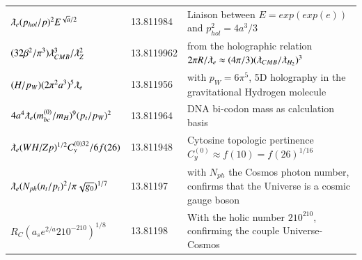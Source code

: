 \documentclass[a4paper,9pt]{article}
\begin{document}
\begin{table}
\begin{tabular}{lll}
  
 
  $ \lambdabar_e (p_{hol}/p)^2 E^{\sqrt a/2}$ & 13.811984 & Liaison between $E = exp(exp(e))$ and $p_{hol}^2 = 4a^3/3$   \\
  
  
  
  
  
 $ (32 \beta^2 /\pi^3) \lambdabar_{CMB}^3/ \lambdabar_Z^2$ & 13.8119962 & from the holographic relation $2\pi R/\lambdabar_e \approx (4\pi/3) (\lambdabar_{CMB}/\lambdabar_{H_2})^3$ \cite{Sanchez2}\\ 
  
  
  
  
  
  
 $(H/p_W)(2\pi^2 a^3)^5 \lambdabar_{e} $ & 13.811956 & with $p_W = 6\pi^5$, 5D holography in the gravitational Hydrogen molecule \cite{Sanchez3}  \\
 
 
 
   
  
  
  $ 4 a^4 \lambdabar_{e} (m_{bc}^{(0)}/m_H)^9 (p_t/p_W)^2  $ & 13.811964 & DNA bi-codon mass as calculation basis  \\
  
  
  $ \lambdabar_{e} (WH/Zp)^{1/2} C_y^{(0)32}/6f(26)   $ & 13.811948 & Cytosine topologic pertinence  $C_y^{(0)} \approx f(10)= f(26)^{1/16} $  \\
  
  $ \lambdabar_{e} (N_{ph}  (n_t/p_t)^2/\pi \sqrt{g_0})^{1/7} $ & 13.81197 & with $N_{ph}$ the Cosmos photon number, confirms that the Universe is a cosmic gauge boson \\
  
   
 $R_C (a_se^{2/a}210^{-210})^{1/8}$  & 13.81198    & With the holic number $210^{210}$, confirming the couple Universe- Cosmos \\
 

\end{tabular}
\end{table}
\end{document}
